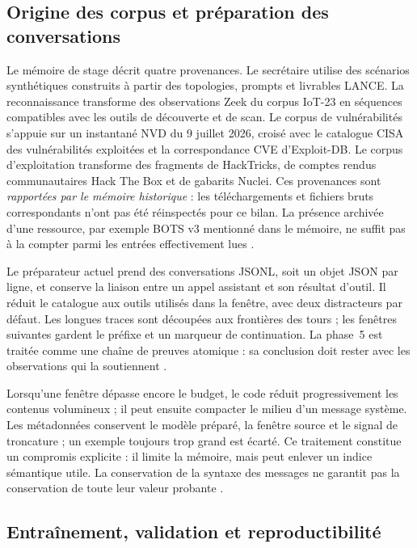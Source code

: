 \documentclass[11pt,a4paper]{article}
\begin{document}
\subsection{Origine des corpus et préparation des conversations}

Le mémoire de stage décrit quatre provenances. Le secrétaire utilise des
scénarios synthétiques construits à partir des topologies, prompts et livrables
LANCE. La reconnaissance transforme des observations Zeek du corpus IoT-23 en
séquences compatibles avec les outils de découverte et de scan. Le corpus de
vulnérabilités s'appuie sur un instantané NVD du 9 juillet 2026, croisé avec le
catalogue CISA des vulnérabilités exploitées et la correspondance CVE
d'Exploit-DB. Le corpus d'exploitation transforme des fragments de HackTricks,
de comptes rendus communautaires Hack The Box et de gabarits Nuclei. Ces
provenances sont \emph{rapportées par le mémoire historique} : les téléchargements
et fichiers bruts correspondants n'ont pas été réinspectés pour ce bilan.
La présence archivée d'une ressource, par exemple BOTS v3 mentionné dans le
mémoire, ne suffit pas à la compter parmi les entrées effectivement lues
\cite{ml-memoire}.

Le préparateur actuel prend des conversations JSONL, soit un objet JSON par
ligne, et conserve la liaison
entre un appel assistant et son résultat d'outil. Il réduit le catalogue aux
outils utilisés dans la fenêtre, avec deux distracteurs par défaut. Les longues
traces sont découpées aux frontières des tours ; les fenêtres suivantes gardent
le préfixe et un marqueur de continuation. La phase~5 est traitée comme une
chaîne de preuves atomique : sa conclusion doit rester avec les observations
qui la soutiennent \cite{ml-prepare}.

Lorsqu'une fenêtre dépasse encore le budget, le code réduit progressivement les
contenus volumineux ; il peut ensuite compacter le milieu d'un message système.
Les métadonnées conservent le modèle préparé, la fenêtre source et le signal de
troncature ; un exemple toujours trop grand est écarté. Ce traitement constitue
un compromis explicite : il limite la mémoire, mais peut enlever un indice
sémantique utile. La conservation de la syntaxe des messages ne garantit pas la
conservation de toute leur valeur probante \cite{ml-prepare}.

\subsection{Entraînement, validation et reproductibilité}
\end{document}
